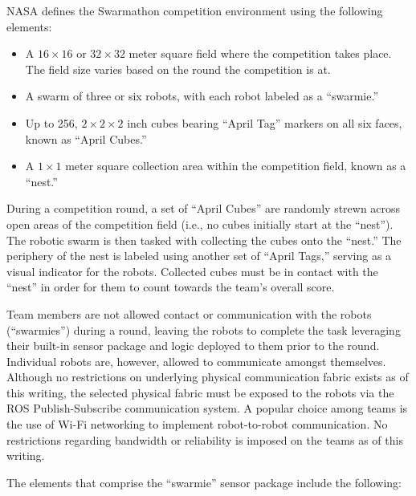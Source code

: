 \documentclass[sigconf,authordraft]{acmart}
\begin{document}
NASA defines the Swarmathon competition environment using the following
elements:

\begin{itemize}
  \item A $16 \times 16$ or $32 \times 32$ meter square field where the
  competition takes place. The field size varies based on the round the
  competition is at.
  \item A swarm of three or six robots, with each robot labeled as a
  ``swarmie.''
  \item Up to 256, $2 \times 2 \times 2$ inch cubes bearing ``April Tag''
  markers on all six faces, known as ``April Cubes.''
  \item A $1 \times 1$ meter square collection area within the competition
  field, known as a ``nest.''
\end{itemize}

During a competition round, a set of ``April Cubes'' are randomly strewn across
open areas of the competition field (i.e., no cubes initially start at
the ``nest''). The robotic swarm is then tasked with collecting the cubes onto
the ``nest.'' The periphery of the nest is labeled using another set of ``April
Tags,'' serving as a visual indicator for the robots. Collected cubes must be
in contact with the ``nest'' in order for them to count towards the team's
overall score.

Team members are not allowed contact or communication with the robots
(``swarmies'') during a round, leaving the robots to complete the task
leveraging their built-in sensor package and logic deployed to them prior to the
round. Individual robots are, however, allowed to communicate amongst
themselves. Although no restrictions on underlying physical communication fabric
exists as of this writing, the selected physical fabric must be exposed to the
robots via the ROS Publish-Subscribe communication system. A popular choice among teams is the use of Wi-Fi networking to implement robot-to-robot communication. No restrictions regarding bandwidth or reliability is imposed on the teams as of this writing.

The elements that comprise the ``swarmie'' sensor package include the
following:
\end{document}
